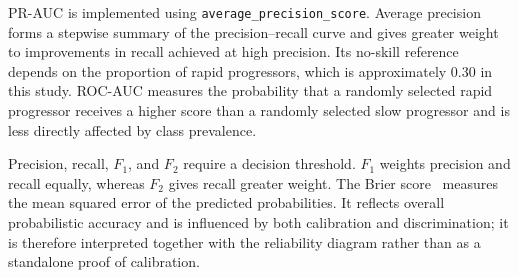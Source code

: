 \gls{PR-AUC} is implemented using \texttt{average\_precision\_score}. Average precision forms a stepwise summary of the precision--recall curve and gives greater weight to improvements in recall achieved at high precision. Its no-skill reference depends on the proportion of rapid progressors, which is approximately 0.30 in this study. \gls{ROC-AUC} measures the probability that a randomly selected rapid progressor receives a higher score than a randomly selected slow progressor and is less directly affected by class prevalence.

Precision, recall, $F_1$, and $F_2$ require a decision threshold. $F_1$ weights precision and recall equally, whereas $F_2$ gives recall greater weight. The Brier score~\cite{brier1950verification} measures the mean squared error of the predicted probabilities. It reflects overall probabilistic accuracy and is influenced by both calibration and discrimination; it is therefore interpreted together with the reliability diagram rather than as a standalone proof of calibration.

\begin{table}[ht!]
\centering
\caption[Evaluation metrics definitions]{Evaluation metrics used in this work. All metrics are computed with respect to the positive class (\textit{rapid} progression) unless stated otherwise.}
\label{tab:metrics}
\small
\renewcommand{\arraystretch}{1.8}
\renewcommand{\arraystretch}{1.0}
\end{table}

